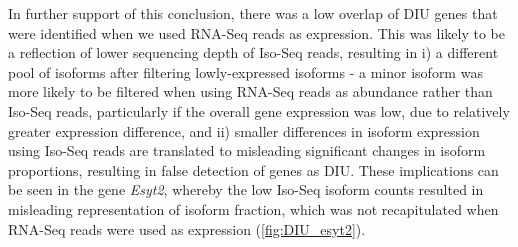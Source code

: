 In further support of this conclusion, there was a low overlap of DIU genes that were identified when we used RNA-Seq reads as expression. This was likely to be a reflection of lower sequencing depth of Iso-Seq reads, resulting in i) a different pool of isoforms after filtering lowly-expressed isoforms - a minor isoform was more likely to be filtered when using RNA-Seq reads as abundance rather than Iso-Seq reads, particularly if the overall gene expression was low, due to relatively greater expression difference, and ii) smaller differences in isoform expression using Iso-Seq reads are translated to misleading significant changes in isoform proportions, resulting in false detection of genes as DIU. These implications can be seen in the gene \textit{Esyt2}, whereby the low Iso-Seq isoform counts resulted in misleading representation of isoform fraction, which was not recapitulated when RNA-Seq reads were used as expression (\cref{fig:DIU_esyt2}). 

